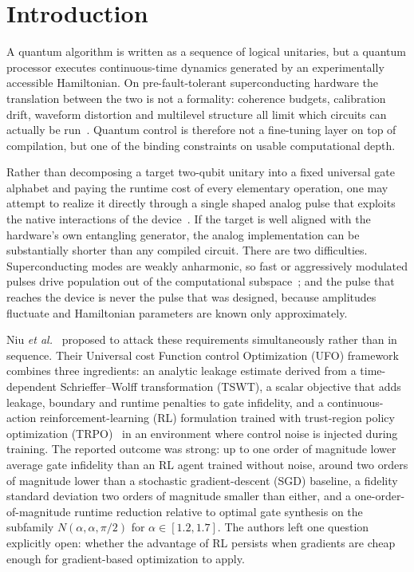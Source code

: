 \documentclass[aps,prx,twocolumn,superscriptaddress,nofootinbib,amsmath,amssymb,floatfix]{revtex4-2}
\newcommand{\Ntgt}[2]{N(#1,#1,#2)}
\begin{document}
\section{Introduction}
\label{sec:intro}

A quantum algorithm is written as a sequence of logical unitaries, but a quantum processor executes
continuous-time dynamics generated by an experimentally accessible Hamiltonian. On pre-fault-tolerant
superconducting hardware the translation between the two is not a formality: coherence budgets,
calibration drift, waveform distortion and multilevel structure all limit which circuits can actually
be run~\cite{Krantz2019,Kjaergaard2020,Koch2022}. Quantum control is therefore not a fine-tuning layer
on top of compilation, but one of the binding constraints on usable computational depth.

Rather than decomposing a target two-qubit unitary
into a fixed universal gate alphabet and paying the runtime cost of every elementary operation, one
may attempt to realize it directly through a single shaped analog pulse that exploits the native
interactions of the device~\cite{Niu2019,Chen2014}. If the target is well
aligned with the hardware's own entangling generator, the analog implementation can be substantially
shorter than any compiled circuit. There are two difficulties. Superconducting modes are
weakly anharmonic, so fast or aggressively modulated pulses drive population out of the computational
subspace~\cite{Motzoi2009,Werninghaus2021}; and the pulse that reaches the device is never the pulse
that was designed, because amplitudes fluctuate and Hamiltonian parameters are known only
approximately.

Niu \emph{et al.}~\cite{Niu2019} proposed to attack these requirements simultaneously rather than in
sequence. Their Universal cost Function control Optimization (UFO) framework combines three
ingredients: an analytic leakage estimate derived from a time-dependent Schrieffer--Wolff
transformation (TSWT), a scalar objective that adds leakage, boundary and runtime penalties to gate
infidelity, and a continuous-action reinforcement-learning (RL) formulation trained with trust-region
policy optimization (TRPO)~\cite{Schulman2015} in an environment where control noise is injected during
training. The reported outcome was strong: up to one order of magnitude lower average gate infidelity
than an RL agent trained without noise, around two orders of magnitude lower than a stochastic
gradient-descent (SGD) baseline, a fidelity standard deviation two orders of magnitude smaller than
either, and a one-order-of-magnitude runtime reduction relative to optimal gate synthesis on the
subfamily $\Ntgt{\alpha}{\pi/2}$ for $\alpha\in[1.2,1.7]$. The authors left one question explicitly
open: whether the advantage of RL persists when gradients are cheap enough for gradient-based
optimization to apply.
\end{document}
